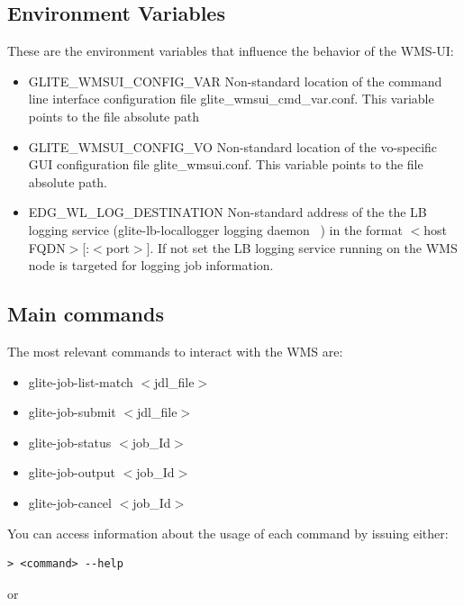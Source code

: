 \subsection{Environment Variables}

These are the environment variables that influence the behavior of the WMS-UI:

\begin{itemize}
 \item GLITE\_WMSUI\_CONFIG\_VAR Non-standard location of the command line interface configuration file 
   glite\_wmsui\_cmd\_var.conf. This variable points to the file absolute path
 \item GLITE\_WMSUI\_CONFIG\_VO  Non-standard location of the vo-specific GUI configuration file 
   glite\_wmsui.conf. This variable points to the file absolute path.
 \item EDG\_WL\_LOG\_DESTINATION Non-standard address of the the LB logging service (glite-lb-locallogger logging 
   daemon ~\cite{lb}) in the format $<$host FQDN$>$[:$<$port$>$]. If not set the LB logging service running on the WMS node is
   targeted for logging job information.
\end{itemize}


\subsection{Main commands}

The most relevant commands to interact with the WMS are:

\begin{itemize}
   \item glite-job-list-match $<$jdl\_file$>$
   \item glite-job-submit $<$jdl\_file$>$
   \item glite-job-status $<$job\_Id$>$
   \item glite-job-output $<$job\_Id$>$
   \item glite-job-cancel $<$job\_Id$>$
\end{itemize}

You can access information about the usage of each command by issuing either:

\smallskip
\begin{scriptsize}
\begin{verbatim}
> <command> --help
\end{verbatim}
\end{scriptsize}

\smallskip
or
\smallskip


